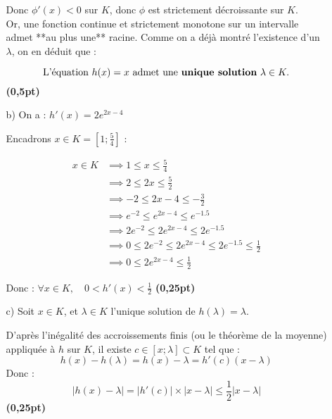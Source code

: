 \documentclass[12pt,a4paper]{article}
\begin{document}
\begin{enumerate}
\begin{enumerate}
                  Donc \( \phi'(x) < 0 \) sur \( K \), donc \( \phi \) est strictement décroissante sur \( K \).\\

                  Or, une fonction continue et strictement monotone sur un intervalle admet **au plus une** racine. Comme on a déjà montré l’existence d’un \( \lambda \), on en déduit que :

                  \[
                      \text{L’équation } h(x) = x \text{ admet une \textbf{unique solution} } \lambda \in K.
                  \] \hfill \textbf{(0,5pt)}

              \item[b)] On a : \( h'(x) = 2e^{2x - 4} \)

                  Encadrons \( x \in K = \left[1 ; \frac{5}{4} \right] \) :

                  \begin{equation*}
                      \begin{aligned}
                          x \in K & \implies 1 \leq x \leq \frac{5}{4}                                       \\
                                  & \implies 2 \leq 2x \leq \frac{5}{2}                                      \\
                                  & \implies -2 \leq 2x - 4 \leq -\frac{3}{2}                                \\
                                  & \implies e^{-2} \leq e^{2x - 4} \leq e^{-1.5}                            \\
                                  & \implies 2e^{-2} \leq 2e^{2x - 4} \leq 2e^{-1.5}                         \\
                                  & \implies 0 \leq 2e^{-2} \leq 2e^{2x - 4} \leq 2e^{-1.5} \leq \frac{1}{2} \\
                                  & \implies 0 \leq 2e^{2x - 4} \leq \frac{1}{2}
                      \end{aligned}
                  \end{equation*}

                  Donc : \( \forall x \in K, \quad 0 < h'(x) < \frac{1}{2} \) \hfill \textbf{(0,25pt)}
              \item[c)] Soit \( x \in K \), et \( \lambda \in K \) l’unique solution de \( h(\lambda) = \lambda \).

                  D’après l’inégalité des accroissements finis (ou le théorème de la moyenne) appliquée à \( h \) sur \( K \), il existe \( c \in [x ; \lambda] \subset K \) tel que :
                  \[
                      h(x) - h(\lambda) = h(x) - \lambda = h'(c)(x - \lambda)
                  \]
                  Donc :
                  \[
                      |h(x) - \lambda| = |h'(c)| \times |x - \lambda| \leq \frac{1}{2} |x - \lambda|
                  \]
                  \hfill \textbf{(0,25pt)}
          \end{enumerate}


\end{enumerate}
\end{document}
